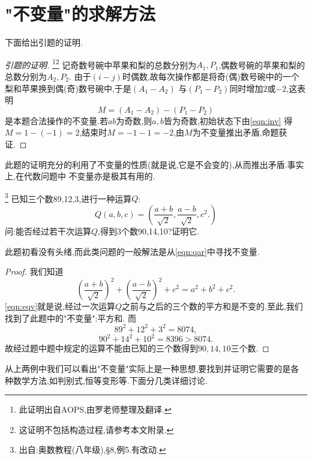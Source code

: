 \section{"不变量"的求解方法}
下面给出引题的证明.
\begin{proof}[引题的证明]\footnote{此证明出自AOPS,由罗老师整理及翻译.}\footnote{这证明不包括构造过程,请参考本文附录.}
记奇数号碗中苹果和梨的总数分别为$A_1,P_1$,偶数号碗的苹果和梨的总数分别为$A_2,P_2$.
由于$(i-j)$时偶数,故每次操作都是将奇(偶)数号碗中的一个梨和苹果换到偶(奇)数号碗中,于是$(A_1-A_2)$
与$(P_1-P_2)$同时增加$2$或$-2$,这表明\begin{equation}
    M=(A_1-A_2)-(P_1-P_2)\label{eqn:inv}
\end{equation}
是本题合法操作的不变量.若$ab$为奇数,则$a,b$皆为奇数,初始状态下由\eqref{eqn:inv}
得$M=1-(-1)=2$,结束时$M=-1-1=-2$,由$M$为不变量推出矛盾,命题获证.
\end{proof}

此题的证明充分的利用了不变量的性质(就是说,它是不会变的),从而推出矛盾.事实上,在代数问题中
不变量亦是极其有用的.
\begin{problem}\footnote{出自:奥数教程(八年级),\S{8},例5.有改动.}
    已知三个数89,12,3,进行一种运算$Q$:\label{pbl:qar}
    \begin{equation}
        Q(a,b,c)=(\dfrac{a+b}{\sqrt{2}},\dfrac{a-b}{\sqrt{2}},c^2.)\label{eqn:qar}
    \end{equation}
    问:能否经过若干次运算$Q$,得到3个数90,14,10?证明它.
\end{problem}
此题初看没有头绪,而此类问题的一般解法是从\eqref{eqn:qar}中寻找不变量.
\begin{proof}
    \songti 我们知道
    \begin{equation}
        \left(\dfrac{a+b}{\sqrt{2}}\right)^2+\left(\dfrac{a-b}{\sqrt{2}}\right)^2+c^2=a^2+b^2+c^2.\label{eqn:eqv}
    \end{equation}
    \eqref{eqn:eqv}就是说,经过一次运算$Q$之前与之后的三个数的平方和是不变的.至此,我们找到了此题中的"不变量":平方和.
    而$${89}^2+12^2+3^2=8074,$$
    $$90^2+14^2+10^2=8396>8074.$$
    故经过题中题中规定的运算不能由已知的三个数得到$90,14,10$三个数.
\end{proof}
从上两例中我们可以看出"不变量"实际上是一种思想,要找到并证明它需要的是各种数学方法,如判别式,恒等变形等.下面分几类详细讨论.
